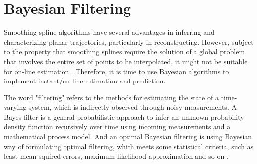 







\section{Bayesian Filtering}

Smoothing spline algorithms have several advantages in inferring and characterizing planar trajectories, particularly in reconstructing. However, subject to the property that smoothing splines require the solution of a global problem that involves the entire set of points to be interpolated, it might not be suitable for on-line estimation \cite{biagiotti2013online}. Therefore, it is time to use Bayesian algorithms to implement instant/on-line estimation and prediction. 


The word "filtering" refers to the methods for estimating the state of a time-varying system, which is indirectly observed through noisy measurements. A Bayes filter is a general probabilistic approach to infer an unknown probability density function recursively over time using incoming measurements and a mathematical process model. And an optimal Bayesian filtering is using Bayesian way of formulating optimal filtering, which meets some statistical criteria, such as least mean squired errors, maximum likelihood approximation and so on \cite{chen2003bayesian} \cite{sarkka2013bayesian}.  


